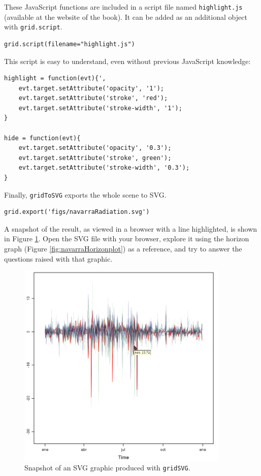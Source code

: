 \documentclass[smallroyalvopaper]{memoir}
\begin{document}
These JavaScript functions are included in a script file named
\texttt{highlight.js} (available at the website of the book). It can be
added as an additional object with \texttt{grid.script}.


\lstset{language=R,numbers=none}
\begin{lstlisting}
grid.script(filename="highlight.js")
\end{lstlisting}

This script is easy to understand, even without previous
JavaScript knowledge:
\begin{verbatim}
highlight = function(evt){',
    evt.target.setAttribute('opacity', '1');
    evt.target.setAttribute('stroke', 'red');
    evt.target.setAttribute('stroke-width', '1');
}

hide = function(evt){
    evt.target.setAttribute('opacity', '0.3');
    evt.target.setAttribute('stroke', green');
    evt.target.setAttribute('stroke-width', '0.3');
}
\end{verbatim}

Finally, \texttt{gridToSVG} exports the whole scene to SVG. 

\lstset{language=R,numbers=none}
\begin{lstlisting}
grid.export('figs/navarraRadiation.svg')
\end{lstlisting}

A snapshot of the result, as viewed in a browser with a line
highlighted, is shown in Figure \ref{fig:navarraSVG}. Open the SVG
file with your browser, explore it using the horizon graph (Figure
\ref{fig:navarraHorizonplot}) as a reference, and try to answer the
questions raised with that graphic.

\begin{figure}
  \centering
  \includegraphics[width=0.9\textwidth]{figs/navarraSVG_captura.png}
  \caption{\label{fig:navarraSVG}Snapshot of an SVG graphic produced with \texttt{gridSVG}.}
\end{figure}
\end{document}
